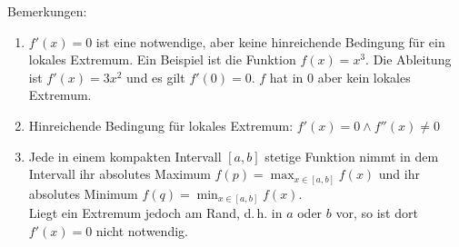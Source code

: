 \documentclass[ngerman,titlepage,twoside, parskip=half*]{scrreprt}
\theoremstyle{break}
\theoremstyle{nonumberbreak}
\begin{document}
Bemerkungen:
\begin{enumerate}[(1)]
  \item $f'(x)=0$ ist eine notwendige, aber keine hinreichende 
    Bedingung für ein lokales Extremum. Ein Beispiel ist die Funktion
    $f(x)=x^3$. Die Ableitung ist $f'(x)=3x^2$ und es gilt $f'(0)=0$.
    $f$ hat in 0 aber kein lokales Extremum.
  \item Hinreichende Bedingung für lokales Extremum: $f'(x)=0\wedge f''(x)\neq 0$
  \item Jede in einem kompakten Intervall $[a,b]$ stetige Funktion nimmt
    in dem Intervall ihr absolutes Maximum $f(p)=\max_{x\in[a,b]}f(x)$
    und ihr absolutes Minimum $f(q)=\min_{x\in[a,b]}f(x)$.\\
    Liegt ein Extremum jedoch am Rand, d.\,h. in $a$ oder $b$ vor, so ist
    dort $f'(x)=0$ nicht notwendig.
\end{enumerate}
\end{document}
